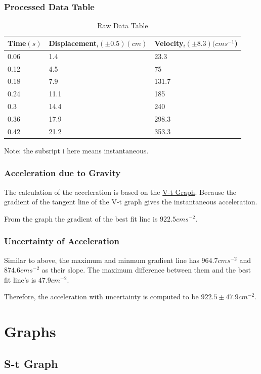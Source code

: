 \documentclass[12pt,a4paper]{article}
\begin{document}
\subsubsection{Processed Data Table}
\begin{table}[!ht]
    \centering
    \begin{tabular}{|l|l|l|}
    \hline
        \textbf{Time$(s)$ } & \textbf{Displacement$_i(\pm0.5)(cm)$ } &
         \textbf{Velocity$_i(\pm 8.3)(cms^{-1}$)} \\ \hline
        0.06  & 1.4  & 23.3  \\ \hline
        0.12  & 4.5  & 75  \\ \hline
        0.18  & 7.9  & 131.7  \\ \hline
        0.24  & 11.1  & 185  \\ \hline
        0.3  & 14.4  & 240  \\ \hline
        0.36  & 17.9  & 298.3  \\ \hline
        0.42 & 21.2 & 353.3 \\ \hline
    \end{tabular}
    \caption{Raw Data Table}
\end{table}
Note: the subsript i here means instantaneous.
\subsubsection{Acceleration due to Gravity}
The calculation of the acceleration is based on the \hyperlink{Graph1}{V-t Graph}.
Because the gradient of the tangent line of the V-t graph gives the instantaneous
acceleration.\par
From the graph the gradient of the best fit line is $922.5cms^{-2}$.
\hypertarget{my result}{\subsubsection{Uncertainty of Acceleration}}
Similar to above, the maximum and minmum gradient line has 
$964.7cms^{-2}$ and $874.6cms^{-2}$ as their slope. The maximum difference
between them and the best fit line's is $47.9cm^{-2}$. \par
Therefore, the acceleration with uncertainty is computed to be $922.5\pm 47.9cm^{-2}$.
\newpage
\section{Graphs}

\subsection{S-t Graph}
\end{document}
